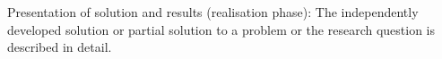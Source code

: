 Presentation of solution and results (realisation phase): The independently developed solution or partial solution
to a problem or the research question is described in detail.
